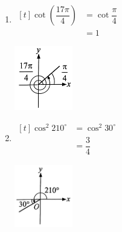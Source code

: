 \documentclass{report}
\begin{document}
\begin{question}
\begin{enumerate}[label=(\alph*),leftmargin=*]
\begin{multicols}{2}
\begin{center}
                \end{center}
            \end{multicols}
            \vspace{-3em}
            \item \begin{multicols}{2}
                $\begin{aligned}[t]
                    \cot\left(\dfrac{17\pi}{4}\right) &= \cot\dfrac{\pi}{4} \\
                    &= 1
                \end{aligned}$
                \vfill\null
                \begin{center}
                    \includegraphics[width=0.2\textwidth]{assets/9-15.jpg}
                \end{center}
            \end{multicols}
            \vspace{-3em}
            \item \begin{multicols}{2}
                $\begin{aligned}[t]
                    \cos^2 210^\circ &= \cos^2 30^\circ \\
                    &= \dfrac{3}{4}
                \end{aligned}$
                \vfill\null
                \begin{center}
                    \includegraphics[width=0.2\textwidth]{assets/9-16.jpg}
                \end{center}
            \end{multicols}
        \end{enumerate}
\end{question}
\end{document}
